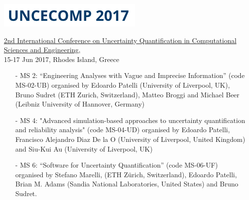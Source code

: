 \documentclass[11pt]{article}%
\begin{document}
\begin{minipage}[t]{0.15\textwidth}
\vspace{1pt}
\includegraphics[width=1\linewidth]{symposia/uncecomp.png}
\end{minipage}
\hspace{2pt}
\begin{minipage}[t]{0.79\textwidth}
\href{https://2017.compdyn.org/}{2nd International Conference on Uncertainty Quantification in Computational Sciences and Engineering},\\ 
15-17 Jun 2017, Rhodes Island, Greece
\begin{itemize}
    \item[-] MS 2: ``Engineering Analyses with Vague and Imprecise Information'' (code MS-02-UB) organised by Edoardo Patelli (University of Liverpool, UK), Bruno Sudret (ETH Zurich, Switzerland), Matteo Broggi and Michael Beer (Leibniz University of Hannover, Germany)
    \item[-] MS 4: "Advanced simulation-based approaches to uncertainty quantification and reliability analysis" (code MS-04-UD) organised by Edoardo Patelli, Francisco Alejandro Diaz De la O (University of Liverpool, United Kingdom) and Siu-Kui Au (University of Liverpool, UK)
    \item[-] MS 6: ``Software for Uncertainty Quantification'' (code MS-06-UF) organised by Stefano Marelli, (ETH Zürich, Switzerland), Edoardo Patelli, Brian M. Adams (Sandia National Laboratories, United States) and Bruno Sudret.
\end{itemize}

\end{minipage}


\vspace{10pt}
\end{document}
